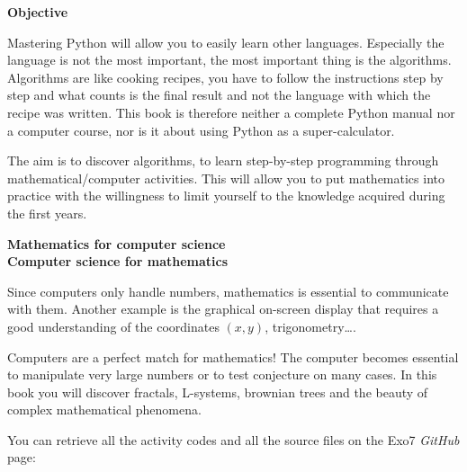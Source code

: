 \bigskip

{\large\textbf{Objective}}

Mastering Python will allow you to easily learn other languages. Especially the language is not the most important, the most important thing is the algorithms. Algorithms are like cooking recipes, you have to follow the instructions step by step and what counts is the final result and not the language with which the recipe was written. This book is therefore neither a complete Python manual nor a computer course, nor is it about using Python as a super-calculator.

The aim is to discover algorithms, to learn step-by-step programming through mathematical/computer activities. This will allow you to put mathematics into practice with the willingness to limit yourself to the knowledge acquired during the first years.

\bigskip

{\large\textbf{Mathematics for computer science}}\\
{\large\textbf{Computer science for mathematics}}

Since computers only handle numbers, mathematics is essential to communicate with them. Another example is the graphical on-screen display that requires a good understanding of the coordinates $(x,y)$, trigonometry\ldots{}.

Computers are a perfect match for mathematics! The computer becomes essential to manipulate very large numbers or to test conjecture on many cases. In this book you will discover fractals, L-systems, brownian trees and the beauty of complex mathematical phenomena.

\bigskip

\begin{center}
You can retrieve all the activity \Python{} codes and all the source files on the Exo7 \emph{GitHub} page:

\medskip

\end{center}


\vspace*{\fill}




